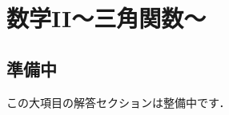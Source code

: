 \documentclass[../../ms_a.tex]{subfiles}
\begin{document}
\section{数学II～三角関数～}

\subsection*{準備中}
この大項目の解答セクションは整備中です．
\end{document}
